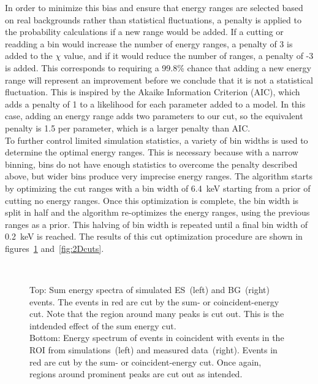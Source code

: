 \documentclass[notitlepage,rmp,aps,10pt]{revtex4-1}
\begin{document}
In order to minimize this bias and ensure that energy ranges are selected based on real backgrounds rather than statistical fluctuations, a penalty is applied to the probability calculations if a new range would be added.
If a cutting or readding a bin would increase the number of energy ranges, a penalty of 3 is added to the $\chi$ value, and if it would reduce the number of ranges, a penalty of -3 is added.
This corresponds to requiring a 99.8\% chance that adding a new energy range will represent an improvement before we conclude that it is not a statistical fluctuation.
This is inspired by the Akaike Information Criterion (AIC), which adds a penalty of 1 to a likelihood for each parameter added to a model.
In this case, adding an energy range adds two parameters to our cut, so the equivalent penalty is 1.5 per parameter, which is a larger penalty than AIC.
\\
To further control limited simulation statistics, a variety of bin widths is used to determine the optimal energy ranges.
This is necessary because with a narrow binning, bins do not have enough statistics to overcome the penalty described above, but wider bins produce very imprecise energy ranges.
The algorithm starts by optimizing the cut ranges with a bin width of 6.4~keV starting from a prior of cutting no energy ranges.
Once this optimization is complete, the bin width is split in half and the algorithm re-optimizes the energy ranges, using the previous ranges as a prior.
This halving of bin width is repeated until a final bin width of 0.2~keV is reached.
The results of this cut optimization procedure are shown in figures~\ref{fig:sumandcoinEcuts} and~\ref{fig:2Dcuts}.
\\
\begin{figure}[!h]
  \centering
  \\
  \caption[Sum and coincident simulated energy spectra with cuts]{\label{fig:sumandcoinEcuts}
    Top: Sum energy spectra of simulated ES~(left) and BG~(right) events. The events in red are cut by the sum- or coincident-energy cut. Note that the region around many peaks is cut out. This is the intdended effect of the sum energy cut.\\
    Bottom: Energy spectrum of events in coincident with events in the ROI from simulations~(left) and measured data~(right). Events in red are cut by the sum- or coincident-energy cut. Once again, regions around prominent peaks are cut out as intended.
  }
\end{figure}
\end{document}
